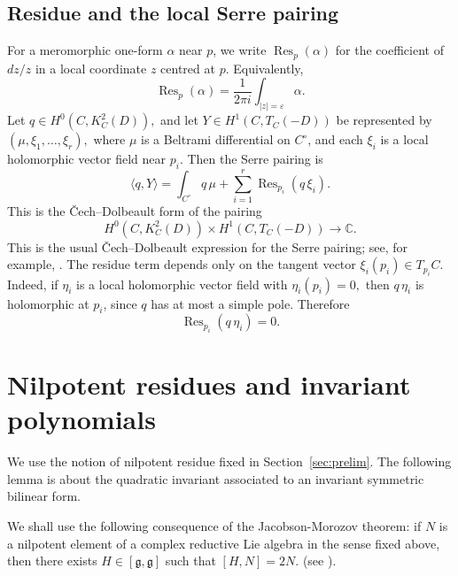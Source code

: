 \documentclass[10pt,a4paper]{amsart}
\numberwithin{equation}{section}
\begin{document}
\subsection{Residue and the local Serre pairing}

For a meromorphic one-form \(\alpha\) near \(p\), we write
\(
        \operatorname{Res}_{p}(\alpha)
\)
for the coefficient of \(dz/z\) in a local coordinate \(z\) centred at \(p\). Equivalently,
\[
        \operatorname{Res}_{p}(\alpha)
        =
        \frac{1}{2\pi i}
        \int_{|z|=\varepsilon}\alpha .
\]
Let
\(
        q\in H^0(C,K_C^2(D)),
\)
and let
\(
        Y\in H^1(C,T_C(-D))
\)
be represented by
\(
        (\mu,\xi_1,\ldots,\xi_r),
\)
where \(\mu\) is a Beltrami differential on \(C^\circ\), and each \(\xi_i\) is
a local holomorphic vector field near \(p_i\). Then the Serre pairing is
\begin{equation}
        \langle q,Y\rangle
        =
        \int_{C^\circ}q\,\mu
        +
        \sum_{i=1}^{r}
        \operatorname{Res}_{p_i}(q\,\xi_i).
        \label{eq:serre-local}
\end{equation}
This is the \v{C}ech--Dolbeault form of the pairing
\[
        H^0(C,K_C^2(D))\times H^1(C,T_C(-D))
        \longrightarrow
        \mathbb C.
\]
This is the usual \v{C}ech--Dolbeault expression for the Serre pairing; see,
for example, \cite[Ch.~2]{GriffithsHarris}.
The residue term depends only on the tangent vector
\(
        \xi_i(p_i)\in T_{p_i}C.
\)
Indeed, if \(\eta_i\) is a local holomorphic vector field with
\(
        \eta_i(p_i)=0,
\)
then \(q\,\eta_i\) is holomorphic at \(p_i\), since \(q\) has at most a simple
pole. Therefore
\[
        \operatorname{Res}_{p_i}(q\,\eta_i)=0.
\]

\section{Nilpotent residues and invariant polynomials}
\label{sec:invpoly}

We use the notion of nilpotent residue fixed in Section~\ref{sec:prelim}. The
following lemma is about the quadratic invariant associated to an invariant
symmetric bilinear form.

We shall use the following consequence of the Jacobson-Morozov
theorem: if \(N\) is a nilpotent element of a complex reductive Lie algebra in
the sense fixed above, then there exists
\(
        H\in[\mathfrak g,\mathfrak g]
\)
such that
\(
        [H,N]=2N.
\)
(see \cite[Ch.~3]{CollingwoodMcGovern}).
\end{document}
